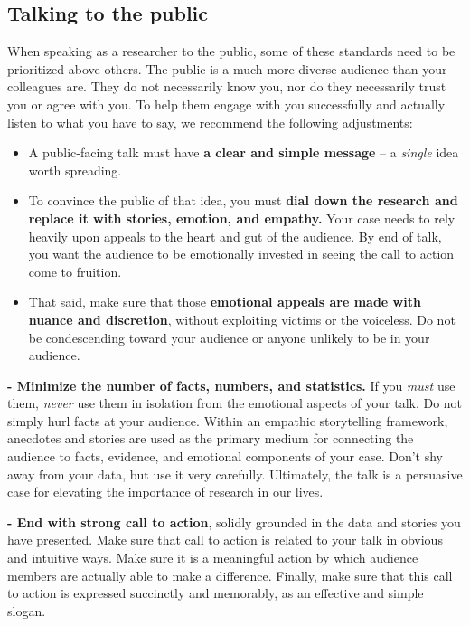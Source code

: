 \documentclass[]{book}
\begin{document}
\hypertarget{talking-to-the-public}{%
\subsection*{Talking to the public}\label{talking-to-the-public}}

When speaking as a researcher to the public, some of these standards need to be prioritized above others. The public is a much more diverse audience than your colleagues are. They do not necessarily know you, nor do they necessarily trust you or agree with you. To help them engage with you successfully and actually listen to what you have to say, we recommend the following adjustments:

\begin{itemize}
\item
  A public-facing talk must have \textbf{a clear and simple message} -- a \emph{single} idea worth spreading.
\item
  To convince the public of that idea, you must \textbf{dial down the research and replace it with stories, emotion, and empathy.} Your case needs to rely heavily upon appeals to the heart and gut of the audience. By end of talk, you want the audience to be emotionally invested in seeing the call to action come to fruition.
\item
  That said, make sure that those \textbf{emotional appeals are made with nuance and discretion}, without exploiting victims or the voiceless. Do not be condescending toward your audience or anyone unlikely to be in your audience.
\end{itemize}

\textbf{- Minimize the number of facts, numbers, and statistics.} If you \emph{must} use them, \emph{never} use them in isolation from the emotional aspects of your talk. Do not simply hurl facts at your audience. Within an empathic storytelling framework, anecdotes and stories are used as the primary medium for connecting the audience to facts, evidence, and emotional components of your case. Don't shy away from your data, but use it very carefully. Ultimately, the talk is a persuasive case for elevating the importance of research in our lives.

\textbf{- End with strong call to action}, solidly grounded in the data and stories you have presented. Make sure that call to action is related to your talk in obvious and intuitive ways. Make sure it is a meaningful action by which audience members are actually able to make a difference. Finally, make sure that this call to action is expressed succinctly and memorably, as an effective and simple slogan.
\end{document}
